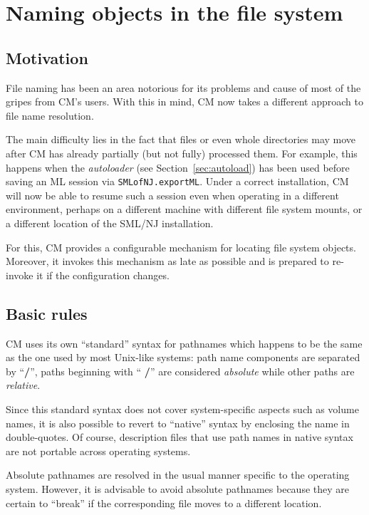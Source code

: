 \documentclass{article}
\begin{document}
\section{Naming objects in the file system}

\subsection{Motivation}

File naming has been an area notorious for its problems and cause of
most of the gripes from CM's users.  With this in mind, CM now takes a
different approach to file name resolution.

The main difficulty lies in the fact that files or even whole
directories may move after CM has already partially (but not fully)
processed them.  For example, this happens when the {\em autoloader}
(see Section~\ref{sec:autoload}) has been used before saving an ML
session via {\tt SMLofNJ.exportML}.  Under a correct installation, CM
will now be able to resume such a session even when operating in a
different environment, perhaps on a different machine with different
file system mounts, or a different location of the SML/NJ
installation.

For this, CM provides a configurable mechanism for locating file
system objects.  Moreover, it invokes this mechanism as late as
possible and is prepared to re-invoke it if the configuration changes.

\subsection{Basic rules}

CM uses its own ``standard'' syntax for pathnames which happens to be
the same as the one used by most Unix-like systems: path name
components are separated by ``{\bf /}'', paths beginning with ``{\bf
/}'' are considered {\em absolute} while other paths are {\em
relative}.

Since this standard syntax does not cover system-specific aspects such
as volume names, it is also possible to revert to ``native'' syntax by
enclosing the name in double-quotes.  Of course, description files
that use path names in native syntax are not portable across operating
systems.

Absolute pathnames are resolved in the usual manner specific to the
operating system.  However, it is advisable to avoid absolute
pathnames because they are certain to ``break'' if the corresponding
file moves to a different location.
\end{document}
